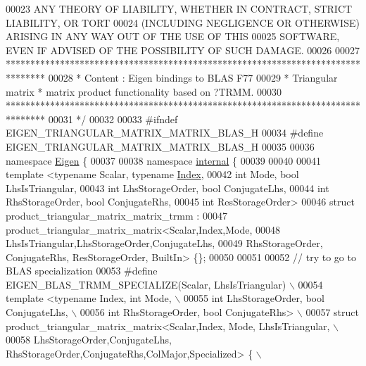 \begin{DoxyCode}
00023 \textcolor{comment}{ ANY THEORY OF LIABILITY, WHETHER IN CONTRACT, STRICT LIABILITY, OR TORT}
00024 \textcolor{comment}{ (INCLUDING NEGLIGENCE OR OTHERWISE) ARISING IN ANY WAY OUT OF THE USE OF THIS}
00025 \textcolor{comment}{ SOFTWARE, EVEN IF ADVISED OF THE POSSIBILITY OF SUCH DAMAGE.}
00026 \textcolor{comment}{}
00027 \textcolor{comment}{ ********************************************************************************}
00028 \textcolor{comment}{ *   Content : Eigen bindings to BLAS F77}
00029 \textcolor{comment}{ *   Triangular matrix * matrix product functionality based on ?TRMM.}
00030 \textcolor{comment}{ ********************************************************************************}
00031 \textcolor{comment}{*/}
00032 
00033 \textcolor{preprocessor}{#ifndef EIGEN\_TRIANGULAR\_MATRIX\_MATRIX\_BLAS\_H}
00034 \textcolor{preprocessor}{#define EIGEN\_TRIANGULAR\_MATRIX\_MATRIX\_BLAS\_H}
00035 
00036 \textcolor{keyword}{namespace }\hyperlink{namespace_eigen}{Eigen} \{ 
00037 
00038 \textcolor{keyword}{namespace }\hyperlink{namespaceinternal}{internal} \{
00039 
00040 
00041 \textcolor{keyword}{template} <\textcolor{keyword}{typename} Scalar, \textcolor{keyword}{typename} \hyperlink{namespace_eigen_a62e77e0933482dafde8fe197d9a2cfde}{Index},
00042           \textcolor{keywordtype}{int} Mode, \textcolor{keywordtype}{bool} LhsIsTriangular,
00043           \textcolor{keywordtype}{int} LhsStorageOrder, \textcolor{keywordtype}{bool} ConjugateLhs,
00044           \textcolor{keywordtype}{int} RhsStorageOrder, \textcolor{keywordtype}{bool} ConjugateRhs,
00045           \textcolor{keywordtype}{int} ResStorageOrder>
00046 \textcolor{keyword}{struct }product\_triangular\_matrix\_matrix\_trmm :
00047        product\_triangular\_matrix\_matrix<Scalar,Index,Mode,
00048           LhsIsTriangular,LhsStorageOrder,ConjugateLhs,
00049           RhsStorageOrder, ConjugateRhs, ResStorageOrder, BuiltIn> \{\};
00050 
00051 
00052 \textcolor{comment}{// try to go to BLAS specialization}
00053 \textcolor{preprocessor}{#define EIGEN\_BLAS\_TRMM\_SPECIALIZE(Scalar, LhsIsTriangular) \(\backslash\)}
00054 \textcolor{preprocessor}{template <typename Index, int Mode, \(\backslash\)}
00055 \textcolor{preprocessor}{          int LhsStorageOrder, bool ConjugateLhs, \(\backslash\)}
00056 \textcolor{preprocessor}{          int RhsStorageOrder, bool ConjugateRhs> \(\backslash\)}
00057 \textcolor{preprocessor}{struct product\_triangular\_matrix\_matrix<Scalar,Index, Mode, LhsIsTriangular, \(\backslash\)}
00058 \textcolor{preprocessor}{           LhsStorageOrder,ConjugateLhs, RhsStorageOrder,ConjugateRhs,ColMajor,Specialized> \{ \(\backslash\)}

\end{DoxyCode}
